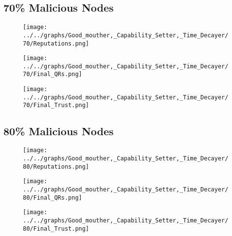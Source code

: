 \begin{minipage}[t]{0.49\columnwidth}
\subsection*{70\% Malicious Nodes}
    \begin{figure}[H]
        \centering
        \texttt{[image: ../../graphs/Good\_mouther,\_Capability\_Setter,\_Time\_Decayer/70/Reputations.png]}
    \end{figure}
    \begin{figure}[H]
        \centering
        \texttt{[image: ../../graphs/Good\_mouther,\_Capability\_Setter,\_Time\_Decayer/70/Final\_QRs.png]}
    \end{figure}
\end{minipage}
\begin{minipage}[t]{0.49\columnwidth}
    \begin{figure}[H]
        \centering
        \texttt{[image: ../../graphs/Good\_mouther,\_Capability\_Setter,\_Time\_Decayer/70/Final\_Trust.png]}
    \end{figure}
\end{minipage}

\begin{minipage}[t]{0.49\columnwidth}
\subsection*{80\% Malicious Nodes}
    \begin{figure}[H]
        \centering
        \texttt{[image: ../../graphs/Good\_mouther,\_Capability\_Setter,\_Time\_Decayer/80/Reputations.png]}
    \end{figure}
    \begin{figure}[H]
        \centering
        \texttt{[image: ../../graphs/Good\_mouther,\_Capability\_Setter,\_Time\_Decayer/80/Final\_QRs.png]}
    \end{figure}
\end{minipage}
\begin{minipage}[t]{0.49\columnwidth}
    \begin{figure}[H]
        \centering
        \texttt{[image: ../../graphs/Good\_mouther,\_Capability\_Setter,\_Time\_Decayer/80/Final\_Trust.png]}
    \end{figure}
\end{minipage}

